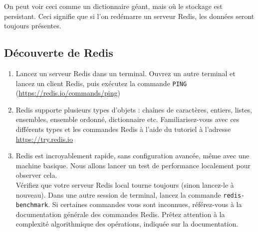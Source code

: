 \documentclass[a4paper,10pt]{article}
\begin{document}
  On peut voir ceci comme un dictionnaire géant, mais où le stockage est persistant. Ceci signifie que si l'on redémarre un serveur Redis, les données seront toujours présentes.
  \subsection{Découverte de Redis}
    \begin{enumerate}
      \item Lancez un serveur Redis dans un terminal. Ouvrez un autre terminal et lancez un client Redis, puis exécutez la commande \texttt{PING} (\url{https://redis.io/commands/ping})
      \item Redis supporte plusieurs types d'objets : chaînes de caractères, entiers, listes, ensembles, ensemble ordonné, dictionnaire etc. Familiarisez-vous avec ces différents types et les commandes Redis à l'aide du tutoriel à l'adresse \url{https://try.redis.io}
      \item Redis est incroyablement rapide, sans configuration avancée, même avec une machine basique. Nous allons lancer un test de performance localement pour observer cela.\\

      Vérifiez que votre serveur Redis local tourne toujours (sinon lancez-le à nouveau). Dans une autre session de terminal, lancez la commande \texttt{redis-benchmark}. Si certaines commandes vous sont inconnues, référez-vous à la documentation générale des commandes Redis. Prêtez attention à la complexité algorithmique des opérations, indiquée sur la documentation.
    \end{enumerate}
\end{document}
